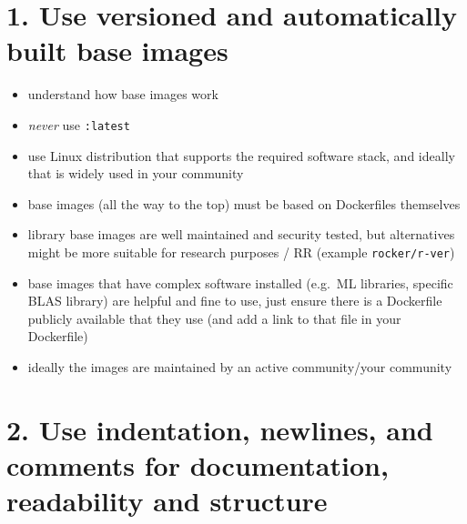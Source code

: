 \documentclass[10pt,letterpaper]{article}
\providecommand{\tightlist}{%
  \setlength{\itemsep}{0pt}\setlength{\parskip}{0pt}}
\begin{document}
\hypertarget{use-versioned-and-automatically-built-base-images}{%
\section*{1. Use versioned and automatically built base
images}\label{use-versioned-and-automatically-built-base-images}}

\begin{itemize}
\tightlist
\item
  understand how base images work
\item
  \emph{never} use \texttt{:latest}
\item
  use Linux distribution that supports the required software stack, and
  ideally that is widely used in your community
\item
  base images (all the way to the top) must be based on Dockerfiles
  themselves
\item
  library base images are well maintained and security tested, but
  alternatives might be more suitable for research purposes / RR
  (example \texttt{rocker/r-ver})
\item
  base images that have complex software installed (e.g.~ML libraries,
  specific BLAS library) are helpful and fine to use, just ensure there
  is a Dockerfile publicly available that they use (and add a link to
  that file in your Dockerfile)
\item
  ideally the images are maintained by an active community/your
  community
\end{itemize}

\hypertarget{use-indentation-newlines-and-comments-for-documentation-readability-and-structure}{%
\section{2. Use indentation, newlines, and comments for documentation,
readability and
structure}\label{use-indentation-newlines-and-comments-for-documentation-readability-and-structure}}
\end{document}
